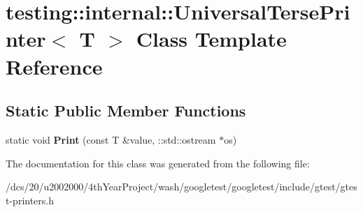 \hypertarget{classtesting_1_1internal_1_1UniversalTersePrinter}{}\section{testing\+:\+:internal\+:\+:Universal\+Terse\+Printer$<$ T $>$ Class Template Reference}
\label{classtesting_1_1internal_1_1UniversalTersePrinter}
\subsection*{Static Public Member Functions}
\begin{DoxyCompactItemize}
\item 
\mbox{\label{classtesting_1_1internal_1_1UniversalTersePrinter_a042249cdb42fdb77588c9ad54ea7ed54}} 
static void {\bfseries Print} (const T \&value, \+::std\+::ostream $\ast$os)
\end{DoxyCompactItemize}


The documentation for this class was generated from the following file\+:\begin{DoxyCompactItemize}
\item 
/dcs/20/u2002000/4th\+Year\+Project/wash/googletest/googletest/include/gtest/gtest-\/printers.\+h\end{DoxyCompactItemize}
